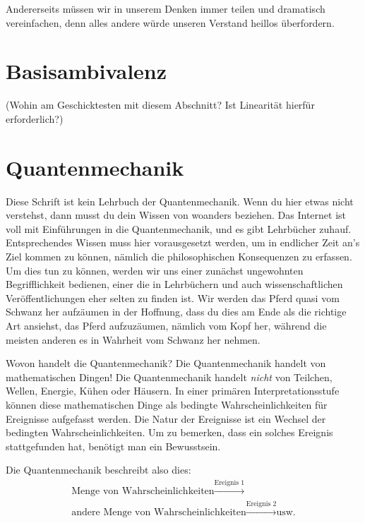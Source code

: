\documentclass[12pt]{book}
\begin{document}
Andererseits müssen wir in unserem Denken immer teilen und dramatisch vereinfachen, denn alles andere würde unseren Verstand heillos überfordern.

\section{Basisambivalenz}

(Wohin am Geschicktesten mit diesem Abschnitt? Ist Linearität hierfür erforderlich?)

\section{Quantenmechanik}

Diese Schrift ist kein Lehrbuch der Quantenmechanik. Wenn du hier etwas nicht verstehst, dann musst du dein Wissen von woanders beziehen. Das Internet ist voll mit Einführungen in die Quantenmechanik, und es gibt Lehrbücher zuhauf. Entsprechendes Wissen muss hier vorausgesetzt werden, um in endlicher Zeit an's Ziel kommen zu können, nämlich die philosophischen Konsequenzen zu erfassen. Um dies tun zu können, werden wir uns einer zunächst ungewohnten Begrifflichkeit bedienen, einer die in Lehrbüchern und auch wissenschaftlichen Veröffentlichungen eher selten zu finden ist. Wir werden das Pferd quasi vom Schwanz her aufzäumen in der Hoffnung, dass du dies am Ende als die richtige Art ansiehst, das Pferd aufzuzäumen, nämlich vom Kopf her, während die meisten anderen es in Wahrheit vom Schwanz her nehmen.

Wovon handelt die Quantenmechanik? Die Quantenmechanik handelt von mathematischen Dingen! Die Quantenmechanik handelt \emph{nicht} von Teilchen, Wellen, Energie, Kühen oder Häusern. In einer primären Interpretationsstufe können diese mathematischen Dinge als bedingte Wahrscheinlichkeiten für Ereignisse aufgefasst werden. Die Natur der Ereignisse ist ein Wechsel der bedingten Wahrscheinlichkeiten. Um zu bemerken, dass ein solches Ereignis stattgefunden hat, benötigt man ein Bewusstsein.

Die Quantenmechanik beschreibt also dies:
\begin{equation} \label{eq:probabilities}
\begin{split}
\textrm{Menge von Wahrscheinlichkeiten} \xrightarrow{\textrm{Ereignis 1}} \\
\textrm{andere Menge von Wahrscheinlichkeiten} \xrightarrow{\textrm{Ereignis 2}}  \textrm{usw.}
\end{split}
\end{equation}
\end{document}
